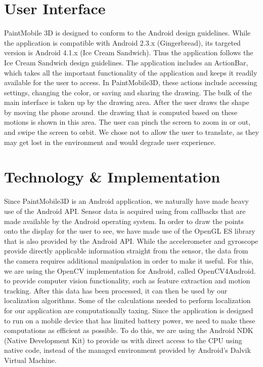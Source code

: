 \documentclass{chi-ext}
\begin{document}

\section{User Interface}

PaintMobile 3D is designed to conform to the Android design guidelines. While the application is compatible with Android 2.3.x (Gingerbread), its targeted version is Android 4.1.x (Ice Cream Sandwich). Thus the application follows the Ice Cream Sandwich design guidelines. The application includes an ActionBar, which takes all the important functionality of the application and keeps it readily available for the user to access. In PaintMobile3D, these actions include accessing settings, changing the color, or saving and sharing the drawing. The bulk of the main interface is taken up by the drawing area. After the user draws the shape by moving the phone around. the drawing that is computed based on these motions is shown in this area. The user can pinch the screen to zoom in or out, and swipe the screen to orbit. We chose not to allow the user to translate, as they may get lost in the environment and would degrade user experience. 

\section{Technology \& Implementation}

Since PaintMobile3D is an Android application, we naturally have made heavy use of the Android API. Sensor data is acquired using from callbacks that are made available by the Android operating system. In order to draw the points onto the display for the user to see, we have made use of the OpenGL ES library that is also provided by the Android API. While the accelerometer and gyroscope provide directly applicable information straight from the sensor, the data from the camera requires additional manipulation in order to make it useful. For this, we are using the OpenCV implementation for Android, called OpenCV4Android. to provide computer vision functionality, such as feature extraction and motion tracking. After this data has been processed, it can then be used by our localization algorithms. Some of the calculations needed to perform localization for our application are computationally taxing. Since the application is designed to run on a mobile device that has limited battery power, we need to make these computations as efficient as possible. To do this, we are using the Android NDK (Native Development Kit) to provide us with direct access to the CPU using native code, instead of the managed environment provided by Android's Dalvik Virtual Machine.
\end{document}
